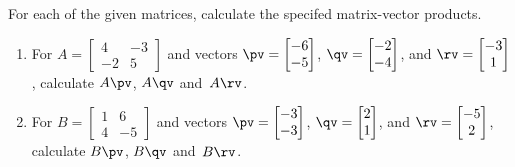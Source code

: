 \begin{exercise} \label{ex:matvc} 
For each of the given matrices, calculate the specifed matrix-vector products.
\begin{enumerate}
\item For \(A=\begin{bmatrix} 4&-3
\\-2&5 \end{bmatrix}\) and vectors 
\(\pv=\begin{bmatrix} -6\\-5 \end{bmatrix}\), 
\(\qv=\begin{bmatrix} -2\\-4 \end{bmatrix}\), and
\(\rv=\begin{bmatrix} -3\\1 \end{bmatrix}\), 
calculate  \(A\pv\), \(A\qv\) and~\(A\rv\).


\item For \(B=\begin{bmatrix} 1&6
\\4&-5 \end{bmatrix}\) and vectors 
\(\pv=\begin{bmatrix} -3\\-3 \end{bmatrix}\), 
\(\qv=\begin{bmatrix} 2\\1 \end{bmatrix}\), and
\(\rv=\begin{bmatrix} -5\\2 \end{bmatrix}\), 
calculate  \(B\pv\), \(B\qv\) and~\(B\rv\).



\end{enumerate}
\end{exercise}
